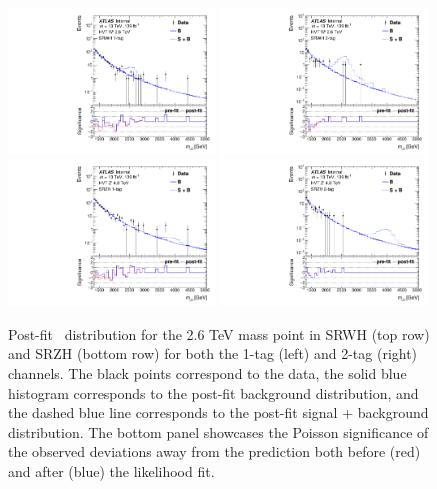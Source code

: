 \begin{figure}[htbp!]
    \begin{center}
        \includegraphics[width=0.49\textwidth]{VHqqbbPrePostFit_Chqqbb_SRWH_1tag_mVH_2600.pdf}
        \includegraphics[width=0.49\textwidth]{VHqqbbPrePostFit_Chqqbb_SRWH_2tag_mVH_2600.pdf} \\
        \includegraphics[width=0.49\textwidth]{VHqqbbPrePostFit_Chqqbb_SRZH_1tag_mVH_4000.pdf}
        \includegraphics[width=0.49\textwidth]{VHqqbbPrePostFit_Chqqbb_SRZH_2tag_mVH_4000.pdf}
    \end{center}
    \caption{Post-fit \mvh\ distribution for the 2.6 TeV mass point in SRWH (top row) and SRZH (bottom row) for both the 1-tag (left) and 2-tag (right) channels.
    The black points correspond to the data, the solid blue histogram corresponds to the post-fit background distribution, and the dashed blue line corresponds to the post-fit signal + background distribution.
    The bottom panel showcases the Poisson significance of the observed deviations away from the prediction both before (red) and after (blue) the likelihood fit.
    }
    \label{fig:post_fit_2p6TeV}
\end{figure}

